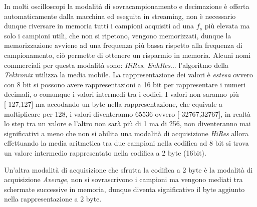 In molti oscilloscopi la modalità di sovracampionamento e decimazione è
offerta automaticamente dalla macchina ed eseguita in streaming, non è 
necessario dunque riversare in memoria tutti i campioni acquisiti ad una $f_s$ 
più elevata ma solo i campioni utili, che non si ripetono, vengono memorizzati, 
dunque la memorizzazione avviene ad una frequenza più bassa rispetto alla 
frequenza di campionamento, ciò permette di ottenere un risparmio in memoria.
Alcuni nomi commerciali per questa modalità sono: \textit{HiRes}, 
\textit{EnhRes}... l'algoritmo della \textit{Tektronix} utilizza la media 
mobile.
La rappresentazione dei valori è \textit{estesa} ovvero con 8 bit si possono 
avere rappresentazioni a 16 bit per rappresentare i numeri decimali, o comunque 
i valori intermedi tra i codici. 
I valori non saranno più [-127,127] ma accodando un byte nella rappresentazione, che equivale a moltiplicare per 128, i valori diventeranno
65536 ovvero [-32767,32767], in realtà lo step tra un valore e l'altro non sarà 
più di 1 ma di 256, non diventeranno mai significativi a meno che non si 
abilita una modalità di acquisizione \textit{HiRes} allora effettuando la media 
aritmetica tra due campioni nella codifica ad 8 bit si trova un valore 
intermedio rappresentato nella codifica a 2 byte (16bit).

Un'altra modalità di acquisizione che sfrutta la codifica a 2 byte è la 
modalità di acquisizione \textit{Average}, non si sovrascrivono i campioni ma 
vengono mediati tra schermate successive in memoria, dunque diventa 
significativo il byte aggiunto nella rappresentazione a 2 byte.
